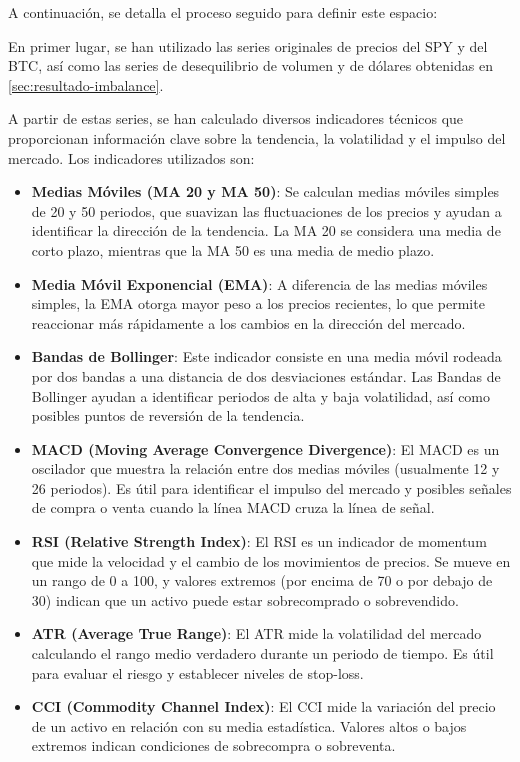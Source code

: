 \documentclass[a4paper,12pt, twoside]{report}
\begin{document}
A continuación, se detalla el proceso seguido para definir este espacio:

En primer lugar, se han utilizado las series originales de precios del SPY y del BTC, 
así como las series de desequilibrio de volumen y de dólares obtenidas en \ref{sec:resultado-imbalance}.

A partir de estas series, se han calculado diversos indicadores técnicos que proporcionan información clave sobre la tendencia, la volatilidad y el impulso del mercado. Los indicadores utilizados son:

\begin{itemize}
    \item \textbf{Medias Móviles (MA 20 y MA 50)}: Se calculan medias móviles simples de 20 y 50 periodos, que suavizan las fluctuaciones de los precios y ayudan a identificar la dirección de la tendencia. La MA 20 se considera una media de corto plazo, mientras que la MA 50 es una media de medio plazo.
    
    \item \textbf{Media Móvil Exponencial (EMA)}: A diferencia de las medias móviles simples, la EMA otorga mayor peso a los precios recientes, lo que permite reaccionar más rápidamente a los cambios en la dirección del mercado.

    \item \textbf{Bandas de Bollinger}: Este indicador consiste en una media móvil rodeada por dos bandas a una distancia de dos desviaciones estándar. Las Bandas de Bollinger ayudan a identificar periodos de alta y baja volatilidad, así como posibles puntos de reversión de la tendencia.

    \item \textbf{MACD (Moving Average Convergence Divergence)}: El MACD es un oscilador que muestra la relación entre dos medias móviles (usualmente 12 y 26 periodos). Es útil para identificar el impulso del mercado y posibles señales de compra o venta cuando la línea MACD cruza la línea de señal.

    \item \textbf{RSI (Relative Strength Index)}: El RSI es un indicador de momentum que mide la velocidad y el cambio de los movimientos de precios. Se mueve en un rango de 0 a 100, y valores extremos (por encima de 70 o por debajo de 30) indican que un activo puede estar sobrecomprado o sobrevendido.

    \item \textbf{ATR (Average True Range)}: El ATR mide la volatilidad del mercado calculando el rango medio verdadero durante un periodo de tiempo. Es útil para evaluar el riesgo y establecer niveles de stop-loss.

    \item \textbf{CCI (Commodity Channel Index)}: El CCI mide la variación del precio de un activo en relación con su media estadística. Valores altos o bajos extremos indican condiciones de sobrecompra o sobreventa.
\end{itemize}
\end{document}

